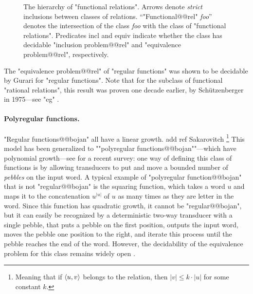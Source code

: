 \begin{figure}
	\caption{
		\AP\label{fig:hierarchy-functional-relations}
		The hierarchy of "functional relations". Arrows denote \emph{strict} inclusions
		between classes of relations.
		``"Functional@@rel" \emph{foo}'' denotes the intersection of the class
		\emph{foo} with the class of "functional relations".
		Predicates \textsf{incl} and \textsf{equiv} indicate
		whether the class has decidable
		"inclusion problem@@rel" and "equivalence problem@@rel", respectively.
	}
\end{figure}

The "equivalence problem@@rel" of "regular functions"
was shown to be decidable by Gurari \cite[Theorem~1]{Gurari1982Equivalence}
for "regular functions". Note that for the subclass of functional "rational relations", this result was proven one decade earlier, by Schützenberger in 1975---see "eg" \cite[Corollary~IV.1.3]{Berstel1979Transductions}.

\paragraph*{Polyregular functions.}
"Regular functions@@bojan" all have a linear growth.%
add ref Sakarovitch
\footnote{Meaning that if $\langle u,v\rangle$ belongs to the relation, then $|v| \leq k\cdot |u|$
for some constant $k$.}
This model has been generalized to \AP""polyregular
functions@@bojan""---which have polynomial growth---see \cite{Bojanczyk2022Transducers} for
a recent survey: one way of defining this class of functions is by allowing transducers
to put and move a bounded number of \emph{pebbles} on the input word.
A typical example of "polyregular function@@bojan" that is not "regular@@bojan"
is the squaring function, which takes a word $u$ and maps it to
the concatenation $u^{|u|}$ of $u$ as many times as they are letter in the word.
Since this function has quadratic growth, it cannot be "regular@@bojan", but
it can easily be recognized by a deterministic two-way transducer with a single pebble,
that puts a pebble on the first position, outputs the input word, moves
the pebble one position to the right, and iterate this process until the pebble reaches
the end of the word.
However, the decidability of the equivalence problem for this class remains widely open
\cite[\S~8]{Bojanczyk2022Transducers}.

